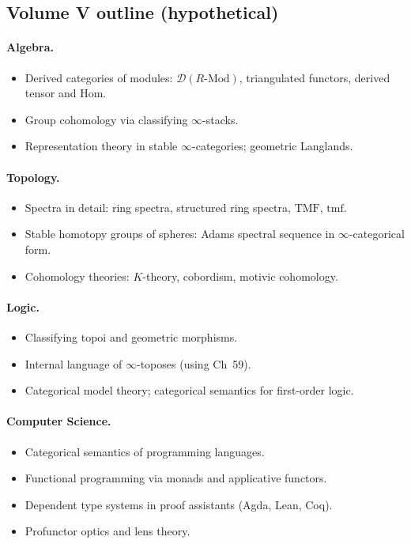 \subsection{Volume V outline (hypothetical)}

\paragraph{Algebra.}
\begin{itemize}
  \item Derived categories of modules: $\mathcal{D}(R\text{-Mod})$,
        triangulated functors, derived tensor and Hom.
  \item Group cohomology via classifying $\infty$-stacks.
  \item Representation theory in stable $\infty$-categories; geometric
        Langlands.
\end{itemize}

\paragraph{Topology.}
\begin{itemize}
  \item Spectra in detail: ring spectra, structured ring spectra,
        $\mathrm{TMF}$, $\mathrm{tmf}$.
  \item Stable homotopy groups of spheres: Adams spectral sequence in
        $\infty$-categorical form.
  \item Cohomology theories: $K$-theory, cobordism, motivic cohomology.
\end{itemize}

\paragraph{Logic.}
\begin{itemize}
  \item Classifying topoi and geometric morphisms.
  \item Internal language of $\infty$-toposes (using Ch~59).
  \item Categorical model theory; categorical semantics for first-order
        logic.
\end{itemize}

\paragraph{Computer Science.}
\begin{itemize}
  \item Categorical semantics of programming languages.
  \item Functional programming via monads and applicative functors.
  \item Dependent type systems in proof assistants (Agda, Lean, Coq).
  \item Profunctor optics and lens theory.
\end{itemize}

